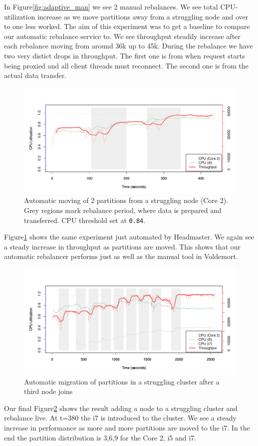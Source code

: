 In Figure\ref{fig:adaptive_man} we see 2 manual rebalances. We see total CPU-utilization increase as we move partitions away from a struggling node and over to one less worked. The aim of this experiment was to get a baseline to compare our automatic rebalance service to. We see throughput steadily increase after each rebalance moving from around 36k up to 45k. During the rebalance we have two very distict drops in throughput. The first one is from when request starts being proxied and all client threads must reconnect. The second one is from the actual data transfer. 

\clearpage
\begin{figure}[h]
    \centering
    \includegraphics[width=1.2\textwidth]{results/rebalance_auto_2node}
    \caption{Automatic moving of 2 partitions from a struggling node (Core 2). Grey regions mark rebalance period, where data is prepared and transferred. CPU threshold set at \texttt{0.84}.}
    \label{fig:adaptive_auto}
\end{figure}
Figure\ref{fig:adaptive_auto} shows the same experiment just automated by Headmaster. We again see a steady increase in throughput as partitions are moved. This shows that our automatic rebalancer performs just as well as the manual tool in Voldemort.  

\clearpage
\begin{figure}[h]
    \centering
    \includegraphics[width=1.0\textwidth]{results/adaptive3node}
    \caption{Automatic migration of partitions in a struggling cluster after a third node joins}
    \label{fig:adapt_3node}
\end{figure}
Our final Figure\ref{fig:adapt_3node} shows the result adding a node to a struggling cluster and rebalance live. At t=380 the i7 is introduced to the cluster. We see a steady increase in performance as more and more partitions are moved to the i7. In the end the partition distribution is 3,6,9 for the Core 2, i5 and i7. 

